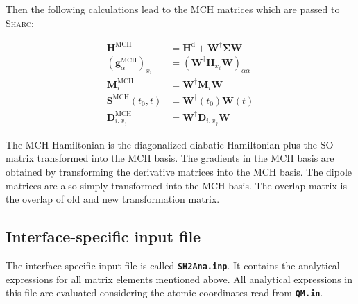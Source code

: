 \documentclass[a4paper,11pt,DIV=15,openany,twoside=false]{scrbook}
\newcommand{\ttmdump}[1]{#1}
\newcommand{\sharc}{\textsc{Sharc}}
\newcommand{\ttt}[1]{\textbf{\texttt{#1}}}
\begin{document}
Then the following calculations lead to the MCH matrices which are passed to \sharc:
\ttmdump{
  \begin{align}
    \mathbf{H}^{\text{MCH}}&=\mathbf{H}^{\text{d}}+\mathbf{W}^\dagger\boldsymbol{\Sigma}\mathbf{W}\\
    \left(\mathbf{g}^{\text{MCH}}_\alpha\right)_{x_i}&=\left(\mathbf{W}^\dagger\mathbf{H}_{x_i}\mathbf{W}\right)_{\alpha\alpha}\\
    \mathbf{M}^{\text{MCH}}_i&=\mathbf{W}^\dagger\mathbf{M}_i\mathbf{W}\\
    \mathbf{S}^{\text{MCH}}(t_0,t)&=\mathbf{W}^\dagger(t_0)\mathbf{W}(t)\\
    \mathbf{D}^{\text{MCH}}_{i,x_j}&=\mathbf{W}^\dagger\mathbf{D}_{i,x_j}\mathbf{W}
  \end{align}
}
The MCH Hamiltonian is the diagonalized diabatic Hamiltonian plus the SO matrix transformed into the MCH basis. The gradients in the MCH basis are obtained by transforming the derivative matrices into the MCH basis. The dipole matrices are also simply transformed into the MCH basis. The overlap matrix is the overlap of old and new transformation matrix.

\subsection{Interface-specific input file}

The interface-specific input file is called \ttt{SH2Ana.inp}. It contains the analytical expressions for all matrix elements mentioned above. All analytical expressions in this file are evaluated considering the atomic coordinates read from \ttt{QM.in}.
\end{document}
